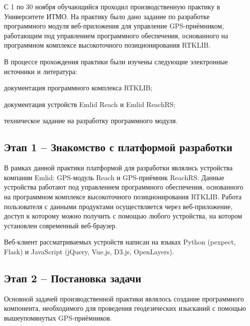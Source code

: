 \documentclass[ltitles]{../../scs-iam}
\begin{document}
  \pagestyle{headcenter}
  
  

  \setcounter{page}{1}
  
  
  С 1 по 30 ноября обучающийся проходил производственную практику в Университете ИТМО. На практику было дано задание по разработке программного модуля веб-приложения для управление GPS-приёмником, работающим под управлением программного обеспечения, основанного на программном комплексе высокоточного позиционирования RTKLIB. \par
  
  В процессе прохождения практики были изучены следующие электронные источники и литература:
  \begin{dashitemize}
    \item документация программного комплекса RTKLIB;
    \item документация устройств Emlid Reach и Emlid ReachRS;
    \item техническое задание на разработку программного модуля.
  \end{dashitemize}

  
  \subsection{Этап 1 -- Знакомство с платформой разработки}
  
  В рамках данной практики платформой для разработки являлись устройства компании Emlid: GPS-модуль Reach и GPS-приёмник ReachRS. Данные устройства работают под управлением программного обеспечения, основанного на программном комплексе высокоточного позиционирования RTKLIB. Работа пользователя с данными продуктами осуществляется через веб-приложение, доступ к которому можно получить с помощью любого устройства, на котором установлен современный веб-браузер. \par
  
  Веб-клиент рассматриваемых устройств написан на языках Python (pexpect, Flask) и JavaScript (jQuery, Vue.js, D3.js, OpenLayers).
  
  \subsection{Этап 2 -- Постановка задачи}
  
  Основной задачей производственной практики являлось создание программного компонента, необходимого для проведения геодезических изысканий с помощью вышеупомянутых GPS-приёмников. \par
  
\end{document}
